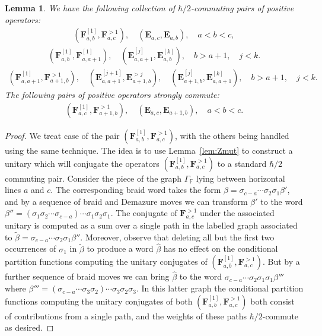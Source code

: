 \documentclass[11pt, reqno]{amsart}
\newtheorem{lemma}[theorem]{Lemma}
\theoremstyle{definition}
\numberwithin{equation}{section}
\def\stgE{\mathbf{E}}
\def\stgF{\mathbf{F}}
\begin{document}
\begin{lemma}
We have the following collection of $\hbar/2$-commuting pairs of positive operators:
\begin{align}
\label{eq:pairs1}
(\stgF_{a,b}^{[1]},\stgF_{a,c}^{>1}),\quad (\stgE_{a,c},\stgE_{a,b}), \quad a<b<c,
\end{align}
\begin{align}
\label{eq:pairs2}
(\stgF_{a,b}^{[1]},\stgF_{a,a+1}^{[1]}), \quad (\stgE_{a,a+1}^{[j]},\stgE_{a,b}^{[k]}), \quad b>a+1, \quad j<k.
\end{align}
\begin{align}
\label{eq:pairs3}
(\stgF_{a,a+1}^{[1]},\stgF_{a+1,b}^{>1}), \quad (\stgE_{a,a+1}^{[j+1]},\stgE_{a+1,b}^{>j}), \quad (\stgE_{a+1,b}^{[j]}, \stgE_{a,a+1}^{[k]}), \quad b>a+1, \quad j<k.
\end{align}
The following pairs of positive operators strongly commute:
\begin{align}
\label{eq:comm-pairs}
(\stgF_{a,c}^{[1]},\stgF_{a+1,b}^{>1}),\quad (\stgE_{a,c},\stgE_{a+1,b}), \quad a<b<c.
\end{align}

\end{lemma}
\begin{proof}
We treat case of the pair $(\stgF_{a,b}^{[1]},\stgF_{a,c}^{>1})$, with the others being handled using the same technique. The idea is to use Lemma~\ref{lem:Zmut} to construct a unitary which will conjugate the operators  $(\stgF_{a,b}^{[1]},\stgF_{a,c}^{>1})$ to a standard $\hbar/2$ commuting pair. Consider the piece of the graph $\Gamma_{\mathbb{F}}$ lying between horizontal lines $a$ and $c$. The corresponding braid word takes the form $\beta = \sigma_{c-a}\cdots \sigma_2 \sigma_1\beta'$, and by a sequence of braid and Demazure moves we can transform $\beta'$ to the word $\beta''=(\sigma_1\sigma_2\cdots\sigma_{c-a})\cdots \sigma_1\sigma_2\sigma_1$. The conjugate of $\stgF_{a,c}^{>1}$ under the associated unitary is computed as a sum over a single path in the labelled graph associated to $\tilde\beta=\sigma_{c-a}\cdots \sigma_2 \sigma_1\beta''$. Moreover, observe that deleting all but the first two occurrences of $\sigma_1$ in $\tilde\beta$ to produce a word $\widehat{\beta}$ has no effect on the conditional partition functions computing the unitary conjugates of $(\stgF_{a,b}^{[1]},\stgF_{a,c}^{>1})$. But by a further sequence of braid moves we can bring $\widehat{\beta}$ to the word $\sigma_{c-a}\cdots \sigma_2 \sigma_1 \sigma_1\beta'''$ where $\beta''' = (\sigma_{c-a}\cdots \sigma_3\sigma_2)\cdots \sigma_3\sigma_2\sigma_3$. In this latter graph the conditional partition functions computing the unitary conjugates of both $(\stgF_{a,b}^{[1]},\stgF_{a,c}^{>1})$ both consist of contributions from a single path, and the weights of these paths $\hbar/2$-commute as desired. 
\end{proof}
\end{document}
